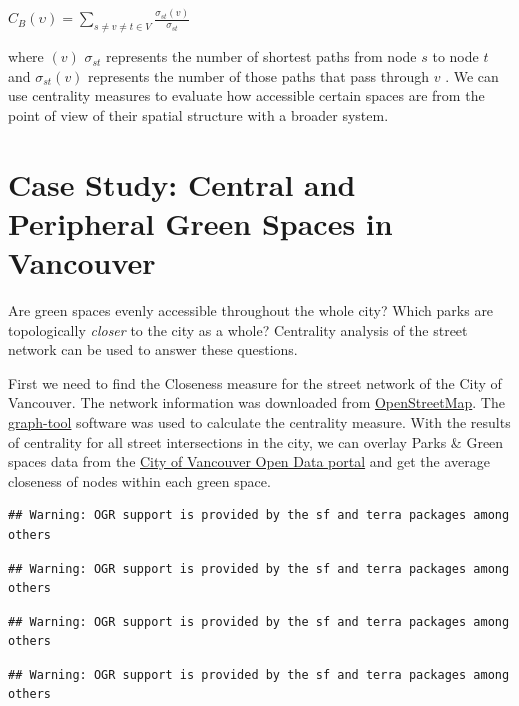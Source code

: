 \documentclass[
]{book}
\begin{document}
\(C_{B}(\upsilon) = \sum\limits_{s \neq v \neq t \in V} \frac {\sigma_{st}(v)}{\sigma_{st}}\)

where \((v)\) \({\sigma_{st}}\) represents the number of shortest paths from node \(s\) to node \(t\) and \({\sigma_{st}(v)}\) represents the number of those paths that pass through \(v\) \citep{graph-tool_centrality_nodate}. We can use centrality measures to evaluate how accessible certain spaces are from the point of view of their spatial structure with a broader system.

\hypertarget{case-study-central-and-peripheral-green-spaces-in-vancouver}{%
\section{Case Study: Central and Peripheral Green Spaces in Vancouver}\label{case-study-central-and-peripheral-green-spaces-in-vancouver}}

Are green spaces evenly accessible throughout the whole city? Which parks are topologically \emph{closer} to the city as a whole? Centrality analysis of the street network can be used to answer these questions.

First we need to find the Closeness measure for the street network of the City of Vancouver. The network information was downloaded from \href{https://www.openstreetmap.org/}{OpenStreetMap}. The \href{https://graph-tool.skewed.de/}{graph-tool} software was used to calculate the centrality measure. With the results of centrality for all street intersections in the city, we can overlay Parks \& Green spaces data from the \href{https://opendata.vancouver.ca/explore/dataset/parks-polygon-representation/information/}{City of Vancouver Open Data portal} and get the average closeness of nodes within each green space.

\begin{verbatim}
## Warning: OGR support is provided by the sf and terra packages among others
\end{verbatim}

\begin{verbatim}
## Warning: OGR support is provided by the sf and terra packages among others
\end{verbatim}

\begin{verbatim}
## Warning: OGR support is provided by the sf and terra packages among others
\end{verbatim}

\begin{verbatim}
## Warning: OGR support is provided by the sf and terra packages among others
\end{verbatim}
\end{document}
